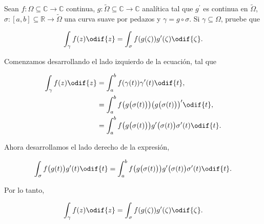 \documentclass[../main.tex]{subfiles}
\begin{document}
\begin{problema}
    Sean \(f \colon \Omega \subseteq \mathbb{C} \to \mathbb{C}\) continua, \(g \colon
    \tilde{\Omega} \subseteq \mathbb{C}\to \mathbb{C}\) analítica tal que
    \(g^{\prime}\) es continua en \(\tilde{\Omega}\), \(\sigma \colon [a, b] \subseteq
    \mathbb{R} \to \tilde{\Omega}\) una curva suave por pedazos y \(\gamma = g \circ
    \sigma\). Si \(\gamma \subseteq \Omega\), pruebe que

    \begin{equation*}
        \int_{\gamma}^{}f(z)\odif{z} =
        \int_{\sigma}^{}f(g(\zeta))g^{\prime}(\zeta)\odif{\zeta}.
    \end{equation*}
\end{problema}

\startsolution

Comenzamos desarrollando el lado izquierdo de la ecuación, tal que

\begin{align*}
    \int_{\gamma}^{}f(z)\odif{z} &=
    \int_{a}^{b}f(\gamma(t))\gamma^{\prime}(t)\odif{t},\\
    &=\int_{a}^{b}f\bigl(g\bigl(\sigma(t)\bigr)\bigr)\bigl(g\bigl(\sigma(t)\bigr)\bigr)^{\prime}\odif{t},\\
    &=
    \int_{a}^{b}f\bigl(g\bigl(\sigma(t)\bigr)\bigr)g^{\prime}\bigl(\sigma(t)\bigr)\sigma^{\prime}(t)\odif{t}.
\end{align*}

Ahora desarrollamos el lado derecho de la expresión,

\begin{equation*}
    \int_{\sigma}^{}f\bigl(g(t)\bigr)g^{\prime}(t)\odif{t} =
    \int_{a}^{b}f\bigl(g\bigl(\sigma(t)\bigr)\bigr)g^{\prime}\bigl(\sigma(t)\bigr)\sigma^{\prime}(t)\odif{t}.
\end{equation*}

Por lo tanto,

\begin{equation*}
    \int_{\gamma}^{}f(z)\odif{z} =
    \int_{\sigma}^{}f(g(\zeta))g^{\prime}(\zeta)\odif{\zeta}.
\end{equation*}
\end{document}
